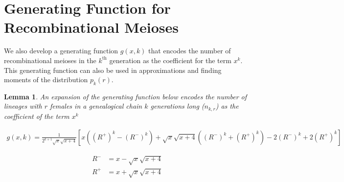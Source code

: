 \documentclass[11pt]{article}
\newtheorem{lemma}{Lemma}
\begin{document}
\section{Generating Function for Recombinational Meioses}
\label{ap:generating-function}

We also develop a generating function $g(x, k)$ that encodes the number of
recombinational meioses in the $k^{\text{th}}$ generation as the coefficient
for the term $x^k$. This generating function can also be used in approximations
and finding moments of the distribution $p_k(r)$.

\begin{lemma}
  An expansion of the generating function below encodes the number of lineages
  with $r$ females in a genealogical chain $k$ generations long ($n_{k,r}$) as
  the coefficient of the term $x^{k}$

  \begin{align}
    g(x, k) = \frac{1}{2^{k+1}\sqrt{x} \sqrt{x+4}}
    \left[x
    \left(\left(R^+\right)^k - \left(R^-\right)^k\right) + \sqrt{x} \sqrt{x+4}
    \left(\left(R^-\right)^k + \left(R^+\right)^k\right)
    -2 \left(R^-\right)^k+2 \left(R^+\right)^k\right]
  \end{align}


\begin{align}
    R^- &= x-\sqrt{x} \sqrt{x+4}\\
    R^+ &= x+\sqrt{x} \sqrt{x+4}
\end{align}

\end{lemma}
\end{document}
